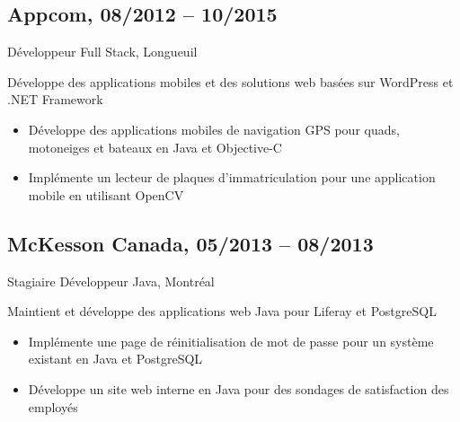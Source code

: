 \documentclass{article}
\begin{document}
\begin{paracol}{2}
\begin{rightcolumn}
    \vspace{1em}  

    \subsection{Appcom, 08/2012 -- 10/2015}  
    {Développeur Full Stack, Longueuil\par}  
    {  
      Développe des applications mobiles et des solutions web basées sur WordPress et .NET Framework
    \par}  
    \begin{itemize}  
      \item Développe des applications mobiles de navigation GPS pour quads, motoneiges et bateaux en Java et Objective-C  
      \item Implémente un lecteur de plaques d’immatriculation pour une application mobile en utilisant OpenCV  
    \end{itemize}  

    \vspace{1em}  

    \subsection{McKesson Canada, 05/2013 -- 08/2013}  
    {Stagiaire Développeur Java, Montréal\par}  
    {  
      Maintient et développe des applications web Java pour Liferay et PostgreSQL  
    \par}  
    \begin{itemize}  
      \item Implémente une page de réinitialisation de mot de passe pour un système existant en Java et PostgreSQL  
      \item Développe un site web interne en Java pour des sondages de satisfaction des employés  
    \end{itemize}  
    
    \flushpage

  \end{rightcolumn}
\end{paracol}
\end{document}

